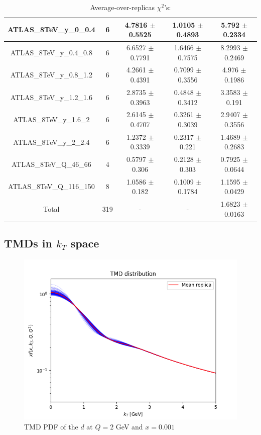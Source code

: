 \documentclass[
]{article}
\begin{document}
\begin{table}[h]
\begin{tabular}{|c|c|c|c|c|}
ATLAS\_8TeV\_y\_0\_0.4 & 6 & 4.7816 \(\pm\) 0.5525 & 1.0105 \(\pm\)
0.4893 & 5.792 \(\pm\) 0.2334 \\ \hline
ATLAS\_8TeV\_y\_0.4\_0.8 & 6 & 6.6527 \(\pm\) 0.7791 & 1.6466 \(\pm\)
0.7575 & 8.2993 \(\pm\) 0.2469 \\ \hline
ATLAS\_8TeV\_y\_0.8\_1.2 & 6 & 4.2661 \(\pm\) 0.4391 & 0.7099 \(\pm\)
0.3556 & 4.976 \(\pm\) 0.1986 \\ \hline
ATLAS\_8TeV\_y\_1.2\_1.6 & 6 & 2.8735 \(\pm\) 0.3963 & 0.4848 \(\pm\)
0.3412 & 3.3583 \(\pm\) 0.191 \\ \hline
ATLAS\_8TeV\_y\_1.6\_2 & 6 & 2.6145 \(\pm\) 0.4707 & 0.3261 \(\pm\)
0.3039 & 2.9407 \(\pm\) 0.3556 \\ \hline
ATLAS\_8TeV\_y\_2\_2.4 & 6 & 1.2372 \(\pm\) 0.3339 & 0.2317 \(\pm\)
0.221 & 1.4689 \(\pm\) 0.2683 \\ \hline
ATLAS\_8TeV\_Q\_46\_66 & 4 & 0.5797 \(\pm\) 0.306 & 0.2128 \(\pm\)
0.303 & 0.7925 \(\pm\) 0.0644 \\ \hline
ATLAS\_8TeV\_Q\_116\_150 & 8 & 1.0586 \(\pm\) 0.182 & 0.1009 \(\pm\)
0.1784 & 1.1595 \(\pm\) 0.0429 \\ \hline
Total & 319 & - & - & 1.6823 \(\pm\) 0.0163 \\ \hline

\end{tabular}

\caption{Average-over-replicas \(\chi^2\)'s:}

\end{table}

\hypertarget{tmds-in-k_t-space}{%
\subsection{\texorpdfstring{TMDs in \(k_T\)
space}{TMDs in k\_T space}}\label{tmds-in-k_t-space}}

\begin{figure}
\centering
\includegraphics{pngplots/tmd_1_2_0.001.png}
\caption{TMD PDF of the \(d\) at \(Q = 2\) GeV and \(x = 0.001\)}
\end{figure}
\end{document}
